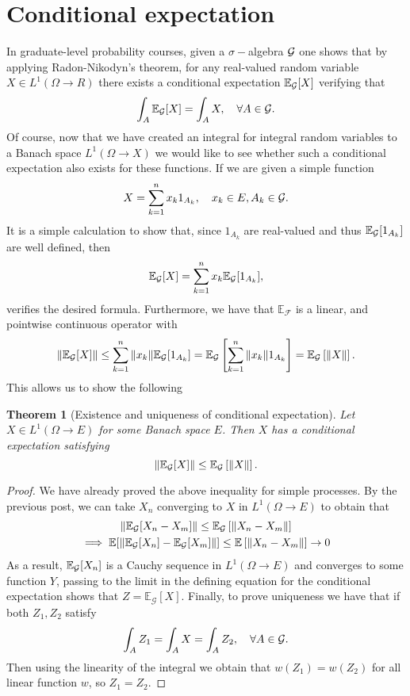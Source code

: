 \documentclass[12pt]{article}
\newtheorem{theorem}{Theorem}
\begin{document}
\section{Conditional expectation}
In graduate-level probability courses, given a $\sigma-$algebra $\mathcal{G}$ one shows that by applying Radon-Nikodyn's theorem, for any real-valued random variable $X\in L^1(\Omega\to R)$ there exists a conditional expectation $\mathbb{E}_{\mathcal{G}}[X]$ verifying that
\begin{equation*}
	\int_A \mathbb{E}_{\mathcal{G}}[X]=\int_A X,\quad \forall A\in\mathcal{G}.
\end{equation*}
Of course, now that we have created an integral for integral random variables to a Banach space $L^1(\Omega\to X)$ we would like to see whether such a conditional expectation also exists for these functions. If we are given a simple function
\begin{equation*}
	X=\sum_{k=1}^n x_k 1_{A_k}, \quad x_k\in E, A_k\in\mathcal{G}.
\end{equation*}
It is a simple calculation to show that, since $1_{A_k}$ are real-valued and thus $\mathbb{E}_{\mathcal{G}}[1_{A_k}]$ are well defined, then
\begin{equation*}
	\mathbb{E}_{\mathcal{G}}[X]=\sum_{k=1}^n x_k \mathbb{E}_{\mathcal{G}}[1_{A_k}],
\end{equation*}
verifies the desired formula. Furthermore, we have that $\mathbb{E}_\mathcal{F}$ is a linear, and pointwise continuous operator with
\begin{equation*}
	\left\|\mathbb{E}_{\mathcal{G}}[X]\right\|\leq \sum_{k=1}^n \|x_k\| \mathbb{E}_{\mathcal{G}}[1_{A_k}]=\mathbb{E}_{\mathcal{G}}\left[\sum_{k=1}^n \|x_k\|1_{A_k}\right]=\mathbb{E}_{\mathcal{G}}\left[\|X\|\right].
\end{equation*}
This allows us to show the following
\begin{theorem}[Existence and uniqueness of conditional expectation]
	Let $X\in L^1(\Omega\to E)$ for some Banach space $E$. Then $X$ has a conditional expectation satisfying
	\begin{equation*}
		\left\|\mathbb{E}_{\mathcal{G}}[X]\right\|\leq\mathbb{E}_{\mathcal{G}}\left[\|X\|\right].
	\end{equation*}
\end{theorem}
\begin{proof}
	We have already proved the above inequality for simple processes. By the previous post, \cite{Bochner} we can take $X_n$ converging to $X$ in $L^1(\Omega\to E)$ to obtain that
	\begin{multline*}
		\left\|\mathbb{E}_{\mathcal{G}}[X_n-X_m]\right\|\leq\mathbb{E}_{\mathcal{G}}\left[\|X_n-X_m\|\right]\\\implies \mathbb{E}[\left\|\mathbb{E}_{\mathcal{G}}[X_n]-\mathbb{E}_{\mathcal{G}}[X_m]\right\|]\leq \mathbb{E}\left[\|X_n-X_m\|\right]\to 0
	\end{multline*}
	As a result, $\mathbb{E}_{\mathcal{G}}[X_n]$ is a Cauchy sequence in $L^1(\Omega\to E)$ and converges to some function $Y$, passing to the limit in the defining equation for the conditional expectation shows that $Z=\mathbb{E}_\mathcal{G}[X]$. Finally, to prove uniqueness we have that if both $Z_1,Z_2$ satisfy
	\begin{equation*}
		\int_A Z_1=\int_A X=\int_A Z_2,\quad \forall A\in\mathcal{G}.
	\end{equation*}
	Then using the linearity of the integral we obtain that $w(Z_1)=w(Z_2)$ for all linear function $w$, so $Z_1=Z_2$.
\end{proof}
\end{document}
